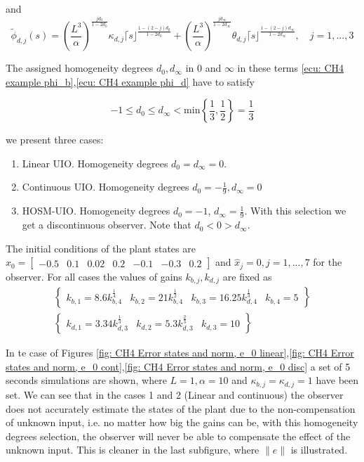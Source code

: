 \documentclass[11pt,letterpaper,twoside,openright]{report}
\newcommand{\sig}[2]{\lceil#1\rfloor^{#2}}
\providecommand{\norm}[1]{\lVert#1\rVert}
\begin{document}
and 
\begin{equation}\label{ecu: CH4 example phi_d}
	\tilde{\phi}_{d,j}(s) = \left( \frac{L^{3}}{\alpha}\right)^{\frac{jd_0}{1-2d_0}}\kappa_{d,j} \sig{s}{\frac{1-(2-j)d_0}{1-2d_0}} + \left( \frac{L^{3}}{\alpha}\right)^{\frac{jd_{\infty}}{1-2d_{\infty}}}\theta_{d,j} \sig{s}{\frac{1-(2-j)d_{\infty}}{1-2d_{\infty}}}, \quad j=1,...,3
\end{equation}

The assigned homogeneity degrees $d_0,d_{\infty}$ in $0$ and $\infty$ in these terms \eqref{ecu: CH4 example phi_b},\eqref{ecu: CH4 example phi_d} have to satisfy

\begin{equation}
	-1 \leq d_0 \leq d_{\infty} < \text{min} \left\lbrace \frac{1}{3},\frac{1}{2}  \right\rbrace = \frac{1}{3}
\end{equation}

we present three cases:
\begin{enumerate}
	\item Linear UIO. Homogeneity degrees $d_0=d_{\infty}=0$.
	\item Continuous UIO. Homogeneity degrees $d_0=-\frac{1}{9},d_{\infty}=0$
	\item HOSM-UIO. Homogeneity degrees $d_0=-1$, $d_{\infty}=\tfrac{1}{9}$. With this selection we get a discontinuous observer. Note that $d_0<0>d_{\infty}$.
\end{enumerate}

The initial conditions of the plant states are $x_0=\begin{bmatrix}	-0.5 & 0.1 & 0.02 & 0.2 & -0.1 & -0.3 & 0.2 \end{bmatrix}$ and $\hat{x}_j=0,j=1,...,7$ for the observer. For all cases the values of gains $k_{b,j}, k_{d,j}$ are fixed as 
\begin{eqnarray}
	&\begin{Bmatrix}
		k_{b,1}=8.6k_{b,4}^{\frac{1}{4}} & k_{b,2}=21k_{b,4}^{\frac{1}{2}} & k_{b,3}=16.25k_{d,4}^{\frac{1}{3}} & k_{b,4}=5
	\end{Bmatrix}&\\	
	&\begin{Bmatrix}
		k_{d,1}=3.34k_{d,3}^{\frac{1}{3}} & k_{d,2}=5.3k_{d,3}^{\frac{2}{3}} & k_{d,3}=10
	\end{Bmatrix}&
\end{eqnarray}

In te case of Figures \ref{fig: CH4 Error states and norm, e_0 linear},\ref{fig: CH4 Error states and norm, e_0 cont},\ref{fig: CH4 Error states and norm, e_0 disc} a set of 5 seconds simulations are shown, where $L=1,\alpha=10$ and $\kappa_{b,j}=\kappa_{d,j}=1$ have been set. We can see that in the cases 1 and 2 (Linear and continuous) the observer does not accurately estimate the states of the plant due to the non-compensation of unknown input, i.e. no matter how big the gains can be, with this homogeneity degrees selection, the observer will never be able to compensate the effect of the unknown input. This is cleaner in the last subfigure, where $\norm{e}$ is illustrated.
 
\end{document}
